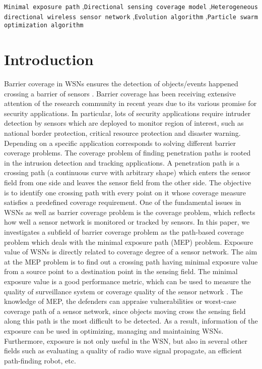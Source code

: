 \documentclass[final]{elsarticle}
\begin{document}
\begin{frontmatter}
\begin{abstract}
\end{abstract}
\begin{keyword}
\texttt{Minimal exposure path} \sep \texttt{Directional sensing coverage model} \sep \texttt{Heterogeneous directional wireless sensor network} \sep \texttt{Evolution algorithm} \sep\texttt{Particle swarm optimization algorithm}
\end{keyword}
\end{frontmatter}
\section{Introduction}
Barrier coverage in WSNs ensures the detection of objects/events happened crossing a barrier of sensors \cite{wu2016survey,wang2011coverage,b15}. Barrier coverage has been receiving extensive attention of the research community in recent years due to its various promise for security applications. In particular, lots of security applications require intruder detection by sensors which are deployed to monitor region of interest, such as national border protection, critical resource protection and disaster warning. Depending on a specific application corresponds to solving different barrier coverage problems. The coverage problem of finding penetration paths is rooted in the intrusion detection and tracking applications. A penetration path is a crossing path (a continuous curve with arbitrary shape) which enters the sensor field from one side and leaves the sensor field from the other side. The objective is to identify one crossing path with every point on it whose coverage measure satisfies a predefined coverage requirement. One of the fundamental issues in WSNs as well as barrier coverage problem is the coverage problem, which reflects how well a sensor network is monitored or tracked by sensors. In this paper, we investigates a subfield of barrier coverage problem as the path-based coverage problem which deals with the minimal exposure path (MEP) problem. Exposure value of WSNs is directly related to coverage degree of a sensor network. The aim at the MEP problem is to find out a crossing path having minimal exposure value from a source point to a destination point in the sensing field. The minimal exposure value is a good performance metric, which can be used to measure the quality of surveillance system or coverage quality of the sensor network \cite{b13,b17}. The knowledge of MEP, the defenders can appraise vulnerabilities or worst-case coverage path of a sensor network, since objects moving cross the sensing field along this path is the most difficult to be detected. As a result, information of the exposure can be used in optimizing, managing and maintaining WSNs. Furthermore, exposure is not only useful in the WSN, but also in several other fields such as evaluating a quality of radio wave signal propagate, an efficient path-finding robot, etc.
\end{document}
